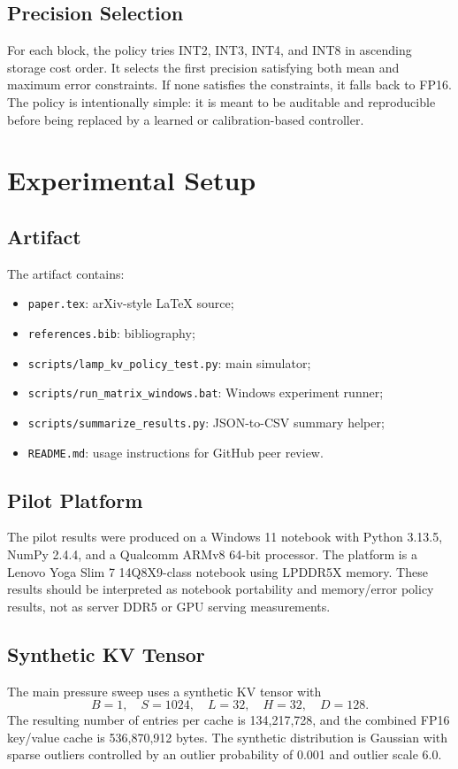 \documentclass[11pt]{article}
\begin{document}
\subsection{Precision Selection}
For each block, the policy tries INT2, INT3, INT4, and INT8 in ascending storage cost order. It selects the first precision satisfying both mean and maximum error constraints. If none satisfies the constraints, it falls back to FP16. The policy is intentionally simple: it is meant to be auditable and reproducible before being replaced by a learned or calibration-based controller.

\section{Experimental Setup}
\subsection{Artifact}
The artifact contains:
\begin{itemize}
    \item \texttt{paper.tex}: arXiv-style LaTeX source;
    \item \texttt{references.bib}: bibliography;
    \item \texttt{scripts/lamp\_kv\_policy\_test.py}: main simulator;
    \item \texttt{scripts/run\_matrix\_windows.bat}: Windows experiment runner;
    \item \texttt{scripts/summarize\_results.py}: JSON-to-CSV summary helper;
    \item \texttt{README.md}: usage instructions for GitHub peer review.
\end{itemize}

\subsection{Pilot Platform}
The pilot results were produced on a Windows 11 notebook with Python 3.13.5, NumPy 2.4.4, and a Qualcomm ARMv8 64-bit processor. The platform is a Lenovo Yoga Slim 7 14Q8X9-class notebook using LPDDR5X memory. These results should be interpreted as notebook portability and memory/error policy results, not as server DDR5 or GPU serving measurements.

\subsection{Synthetic KV Tensor}
The main pressure sweep uses a synthetic KV tensor with
\begin{equation}
    B=1,\quad S=1024,\quad L=32,\quad H=32,\quad D=128.
\end{equation}
The resulting number of entries per cache is 134,217,728, and the combined FP16 key/value cache is 536,870,912 bytes. The synthetic distribution is Gaussian with sparse outliers controlled by an outlier probability of 0.001 and outlier scale 6.0.
\end{document}
